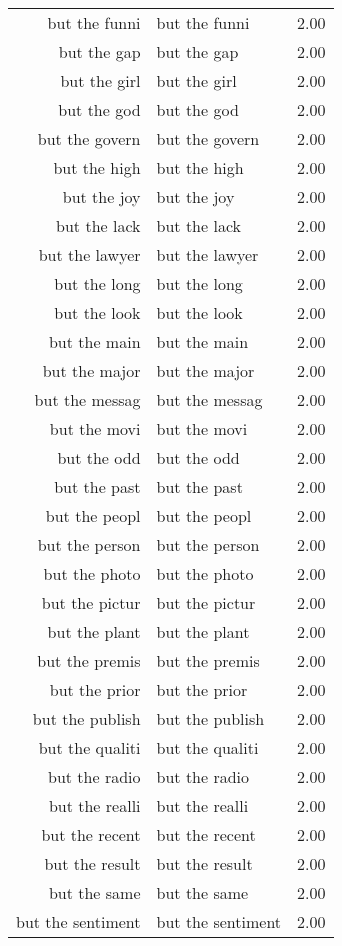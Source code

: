 \begin{table}[ht]
\begin{tabular}{rlr}
  but the funni & but the funni & 2.00 \\ 
  but the gap & but the gap & 2.00 \\ 
  but the girl & but the girl & 2.00 \\ 
  but the god & but the god & 2.00 \\ 
  but the govern & but the govern & 2.00 \\ 
  but the high & but the high & 2.00 \\ 
  but the joy & but the joy & 2.00 \\ 
  but the lack & but the lack & 2.00 \\ 
  but the lawyer & but the lawyer & 2.00 \\ 
  but the long & but the long & 2.00 \\ 
  but the look & but the look & 2.00 \\ 
  but the main & but the main & 2.00 \\ 
  but the major & but the major & 2.00 \\ 
  but the messag & but the messag & 2.00 \\ 
  but the movi & but the movi & 2.00 \\ 
  but the odd & but the odd & 2.00 \\ 
  but the past & but the past & 2.00 \\ 
  but the peopl & but the peopl & 2.00 \\ 
  but the person & but the person & 2.00 \\ 
  but the photo & but the photo & 2.00 \\ 
  but the pictur & but the pictur & 2.00 \\ 
  but the plant & but the plant & 2.00 \\ 
  but the premis & but the premis & 2.00 \\ 
  but the prior & but the prior & 2.00 \\ 
  but the publish & but the publish & 2.00 \\ 
  but the qualiti & but the qualiti & 2.00 \\ 
  but the radio & but the radio & 2.00 \\ 
  but the realli & but the realli & 2.00 \\ 
  but the recent & but the recent & 2.00 \\ 
  but the result & but the result & 2.00 \\ 
  but the same & but the same & 2.00 \\ 
  but the sentiment & but the sentiment & 2.00 \\ 

\end{tabular}
\end{table}
